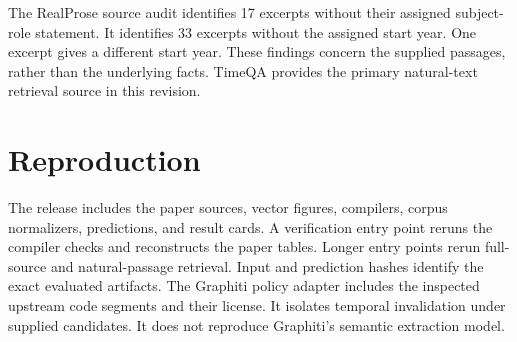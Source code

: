 The RealProse source audit identifies 17 excerpts without their assigned subject-role statement.
It identifies 33 excerpts without the assigned start year.
One excerpt gives a different start year.
These findings concern the supplied passages, rather than the underlying facts.
TimeQA provides the primary natural-text retrieval source in this revision.

\section{Reproduction}
\label{app:reproduction}
The release includes the paper sources, vector figures, compilers, corpus normalizers, predictions, and result cards.
A verification entry point reruns the compiler checks and reconstructs the paper tables.
Longer entry points rerun full-source and natural-passage retrieval.
Input and prediction hashes identify the exact evaluated artifacts.
The Graphiti policy adapter includes the inspected upstream code segments and their license.
It isolates temporal invalidation under supplied candidates.
It does not reproduce Graphiti's semantic extraction model.
